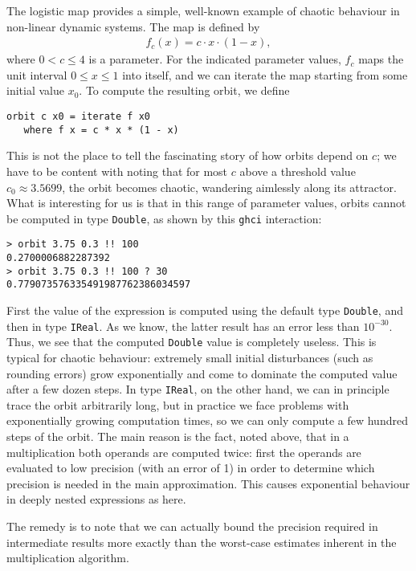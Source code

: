 \documentclass[9pt, a4, twocolumn]{article}
\begin{document}
The logistic map provides a simple, well-known example of chaotic behaviour
in non-linear dynamic systems. The map is defined by
\begin{align*}
  f_c(x) = c \cdot x \cdot (1-x),
\end{align*}
where $0< c \leq 4$ is a parameter. For the indicated parameter
values, $f_c$ maps the unit interval $0 \leq x \leq 1$ into itself,
and we can iterate the map starting from some initial value $x_0$. To
compute the resulting orbit, we define
\begin{verbatim}
orbit c x0 = iterate f x0
   where f x = c * x * (1 - x)
\end{verbatim}
This is not the place to tell the fascinating story of how orbits
depend on $c$; we have to be content with noting that for most $c$ above a
threshold value $c_0 \approx 3.5699$, the orbit becomes chaotic,
wandering aimlessly along its attractor. What is interesting
for us is that in this range of parameter values, orbits cannot be
computed in type \texttt{Double}, as shown by this \texttt{ghci} interaction:
\begin{verbatim}
> orbit 3.75 0.3 !! 100
0.2700006882287392
> orbit 3.75 0.3 !! 100 ? 30
0.779073576335491987762386034597
\end{verbatim}
First the value of the expression is computed using the default type \texttt{Double},
and then in type \texttt{IReal}. As we know, the latter result has
an error less than $10^{-30}$. Thus, we see that
the computed \texttt{Double} value is completely useless. This is
typical for chaotic behaviour: extremely small initial disturbances
(such as rounding errors)
grow exponentially and come to dominate the computed value after a
few dozen steps. In type \texttt{IReal}, on the other hand, we can in 
principle trace the orbit arbitrarily long, but in practice we face
problems with exponentially growing computation times, so we can only
compute a few hundred steps of the orbit. The main reason
is the fact, noted above, that in a multiplication both operands are
computed twice: first the operands are evaluated to low precision
(with an error of 1) in order to determine which precision is needed
in the main approximation. This causes exponential behaviour in deeply
nested expressions as here.

The remedy is to note that we can actually bound the precision required
in intermediate results more exactly than the worst-case estimates
inherent in the multiplication algorithm.
\end{document}
